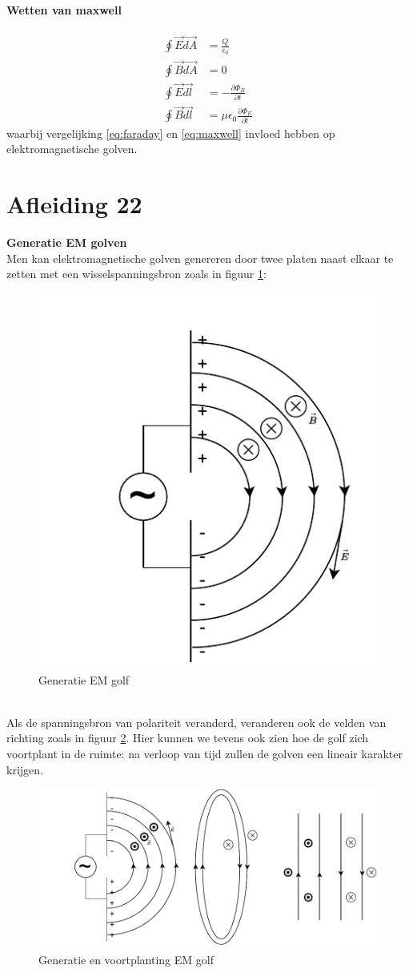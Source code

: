 \documentclass[a4paper,kul]{kulakarticle} %
\begin{document}
\paragraph{Wetten van maxwell}
\begin{align}
	\oint\vec{E}\vec{dA}&=\frac{Q}{\epsilon_0}\\
	\oint\vec{B}\vec{dA}&=0\\
	\label{eq:faraday}
	\oint\vec{E}\vec{dl}&=-\frac{\partial\Phi_B}{\partial t}\\
	\label{eq:maxwell}
	\oint\vec{B}\vec{dl}&=\mu\epsilon_0\frac{\partial\Phi_E}{\partial t}
\end{align}
waarbij vergelijking \ref{eq:faraday} en \ref{eq:maxwell} invloed hebben op elektromagnetische golven.
\newpage
\section{Afleiding 22}
\textbf{Generatie EM golven}\\
Men kan elektromagnetische golven genereren door twee platen naast elkaar te zetten met een wisselspanningsbron zoals in figuur \ref{fig:emgolf1}:
\begin{figure}[h]
	\centering
	\includegraphics[width=0.3\linewidth]{EMGolf1}
	\caption[Generatie]{Generatie EM golf}
	\label{fig:emgolf1}
\end{figure}\\
Als de spanningsbron van polariteit veranderd, veranderen ook de velden van richting zoals in figuur \ref{fig:emgolf2}. Hier kunnen we tevens ook zien hoe de golf zich voortplant in de ruimte: na verloop van tijd zullen de golven een lineair karakter krijgen. 
\begin{figure}[h]
	\centering
	\includegraphics[width=0.7\linewidth]{EMGolf2}
	\caption[Generatie en voortplanting]{Generatie en voortplanting EM golf}
	\label{fig:emgolf2}
\end{figure}
\newpage
\end{document}
